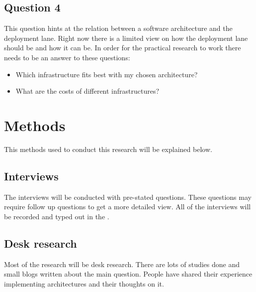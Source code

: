 \subsection{Question 4}


This question hints at the relation between a software architecture and the deployment lane. Right now there is a limited view on how the deployment lane should be and how it can be. In order for the practical research to work there needs to be an answer to these questions:
\begin{itemize}
	\item Which infrastructure fits best with my chosen architecture?
	\item What are the costs of different infrastructures?
\end{itemize}

\section{Methods}

This methods used to conduct this research will be explained below.

\subsection{Interviews}
The interviews will be conducted with pre-stated questions. These questions may require follow up questions to get a more detailed view. All of the interviews will be recorded and typed out in the .

\subsection{Desk research}
Most of the research will be desk research. There are lots of studies done and small blogs written about the main question. People have shared their experience implementing architectures and their thoughts on it.
